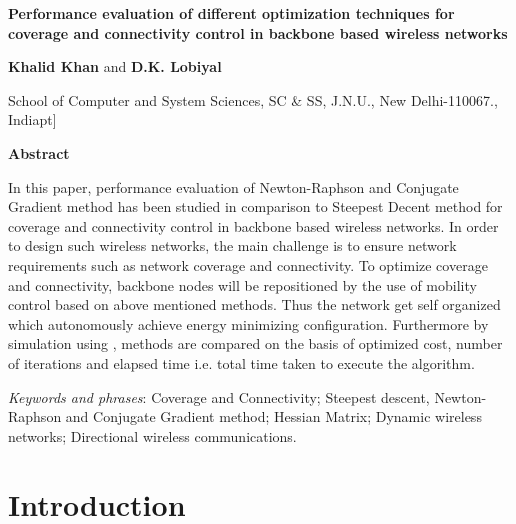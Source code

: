 \documentclass[11pt]{article}
\numberwithin{equation}{section}
\begin{document}
\bigskip

\bigskip

\begin{center}
{\Large \textbf{Performance evaluation of different optimization techniques for coverage and connectivity control in backbone based wireless networks}}

\bigskip

\textbf{Khalid Khan} and \textbf{D.K. Lobiyal}

School of Computer and System Sciences, SC \& SS, J.N.U., New Delhi-110067., India\0pt]

\bigskip

\bigskip


\textbf{Abstract}
\end{center}

\parindent=8mm {\footnotesize {In this paper, performance evaluation of Newton-Raphson and Conjugate Gradient method has been studied in comparison to Steepest Decent method for coverage and connectivity control in backbone based wireless networks. In order to design such wireless networks, the main challenge is to ensure network requirements such as network coverage and connectivity. To optimize coverage and connectivity, backbone nodes will be repositioned by the use of mobility control based on above mentioned methods. Thus the network get self organized which autonomously achieve energy minimizing configuration. Furthermore by simulation using , methods are compared on the basis of optimized cost, number of iterations and elapsed time i.e. total time taken to execute the algorithm.}}

\bigskip

{\footnotesize \emph{Keywords and phrases}: Coverage and Connectivity; Steepest descent, Newton-Raphson and Conjugate Gradient method;  Hessian Matrix; Dynamic wireless networks; Directional wireless communications.}


\bigskip



\section {Introduction}
\end{document}
